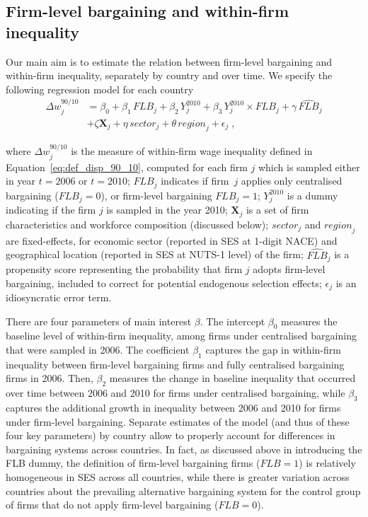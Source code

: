 \documentclass[12pt]{article}
\begin{document}
\subsection{Firm-level bargaining and within-firm inequality}
Our main aim is to estimate the relation between firm-level bargaining and within-firm inequality, separately by country and over time. We specify the following regression model for each country
\begin{equation}
\label{eq:reg_dispersion}
\begin{split}
  \Delta w^{90/10}_j &= \beta_0 + \beta_1\, \mathit{FLB}_j + \beta_2\, \mathit{Y}^{2010}_j + \beta_3\, \mathit{Y}^{2010}_j \times \mathit{FLB}_j + \gamma\, \widehat{\mathit{FLB}}_j \\
                     &+ \zeta\bm{X}_j + \eta\, \mathit{sector}_j + \theta\, \mathit{region}_j + \epsilon_j \;,
 \end{split}
\end{equation}

\noindent where $\Delta w_j^{90/10}$ is the measure of within-firm wage inequality defined in Equation~\eqref{eq:def_disp_90_10}, computed for each firm $j$ which is sampled either in year $t=2006$ or $t=2010$;
$\mathit{FLB}_j$ indicates if firm~$j$ applies only centralised bargaining ($\mathit{FLB}_j=0$), or firm-level bargaining $\mathit{FLB}_j=1$;
$\mathit{Y}^{2010}_j$ is a dummy indicating if the firm $j$ is sampled in the year 2010; $\bm{X}_j$ is a set of firm characteristics and workforce composition (discussed below); $\mathit{sector}_j$ and $\mathit{region}_j$ are fixed-effects, for economic sector (reported in SES at 1-digit NACE) and geographical location (reported in SES at NUTS-1 level) of the firm; $\widehat{\mathit{FLB}}_j$ is a propensity score representing the probability that firm $j$ adopts firm-level bargaining, included to correct for potential endogenous selection effects; $\epsilon_j$ is an idiosyncratic error term. 

There are four parameters of main interest $\beta$. The intercept $\beta_0$ measures the baseline level of within-firm inequality, among firms under centralised bargaining that were sampled in 2006. The coefficient $\beta_1$ captures the gap in within-firm inequality between firm-level bargaining firms and fully centralised bargaining firms in 2006. Then, $\beta_2$ measures the change in baseline inequality that occurred over time between 2006 and 2010 for firms under centralised bargaining, while $\beta_3$ captures the additional growth in inequality between 2006 and 2010 for firms under firm-level bargaining. Separate estimates of the model (and thus of these four key parameters) by country allow to properly account for differences in bargaining systems across countries. In fact, as discussed above in introducing the FLB dummy, the definition of firm-level bargaining firms ($\mathit{FLB}=1$) is relatively homogeneous in SES across all countries, while there is greater variation across countries about the prevailing alternative bargaining system for the control group of firms that do not apply firm-level bargaining ($\mathit{FLB}=0$).
\end{document}

